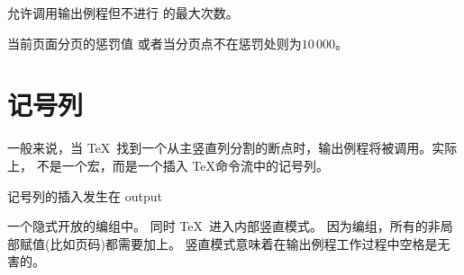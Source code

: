 \documentclass{book}
\begin{document}
\begin{inventory}
\item [\cs{maxdeadcycles}]
      允许调用输出例程但不进行  的最大次数。


\item [\cs{outputpenalty}]
      当前页面分页的惩罚值
 \alt
      或者当分页点不在惩罚处则为$10\,000$。

\end{inventory}


\section{\protect{} 记号列}


一般来说，当 \TeX\ 找到一个从主竖直列分割的断点时，输出例程将被调用。实际上，
 不是一个宏，而是一个插入 \TeX 命令流中的记号列。



 记号列的插入发生在
\cstoidx output\par
一个隐式开放的编组中。
同时 \TeX\  进入内部竖直模式。
因为编组，所有的非局部赋值(比如页码)都需要加上。
竖直模式意味着在输出例程工作过程中空格是无害的。
\end{document}
